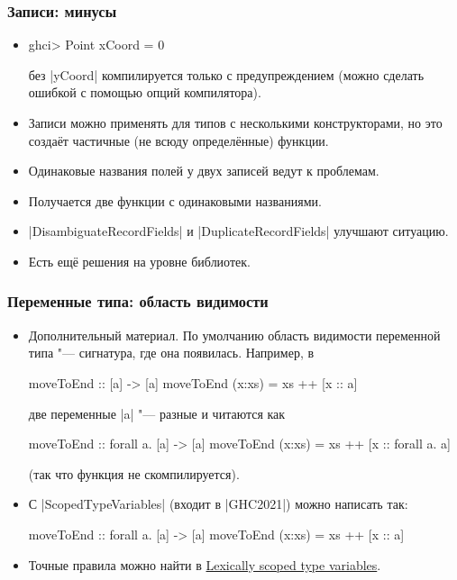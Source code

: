 \documentclass[10pt]{beamer}
\begin{document}
\begin{frame}[fragile]
  \frametitle{Записи: минусы}
  \hyperlink{rec1}{}
  \begin{itemize}
    \item
          \begin{haskell}
ghci> Point { xCoord = 0 }
\end{haskell}
          \pause
          без \haskinline|yCoord| компилируется только с предупреждением (можно сделать ошибкой с помощью опций компилятора).
          \pause
    \item Записи можно применять для типов с несколькими конструкторами, но это создаёт частичные (не всюду определённые) функции.
          \pause
    \item Одинаковые названия полей у двух записей ведут к проблемам.
          \pause
    \item Получается две функции с одинаковыми названиями.
    \item \haskinline|DisambiguateRecordFields| и \haskinline|DuplicateRecordFields| улучшают ситуацию.
          \pause
    \item Есть ещё решения на уровне библиотек.
  \end{itemize}
\end{frame}

\begin{frame}[fragile]
  \frametitle{Переменные типа: область видимости}
  \begin{itemize}
    \item Дополнительный материал. По умолчанию область видимости переменной типа "--- сигнатура, где она появилась. Например, в
          \begin{haskell}
            moveToEnd :: [a] -> [a]
            moveToEnd (x:xs) = xs ++ [x :: a]
          \end{haskell}
          \pause
          две переменные \haskinline|a| "--- разные и читаются как
          \begin{haskell}
            moveToEnd :: forall a. [a] -> [a]
            moveToEnd (x:xs) = xs ++ [x :: forall a. a]
          \end{haskell}
          \pause
          (так что функция не скомпилируется).
          \pause
    \item С \haskinline|ScopedTypeVariables| (входит в \haskinline|GHC2021|) можно написать так:
          \begin{haskell}
            moveToEnd :: forall a. [a] -> [a]
            moveToEnd (x:xs) = xs ++ [x :: a]
          \end{haskell}
    \item Точные правила можно найти в \href{https://downloads.haskell.org/~ghc/latest/docs/users_guide/exts/scoped_type_variables.html}{Lexically scoped type variables}.
  \end{itemize}
\end{frame}
\end{document}
